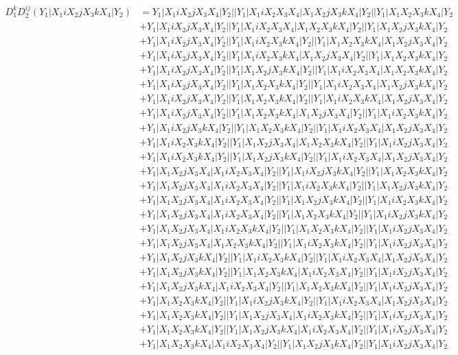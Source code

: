 \documentclass{article}[12pt]
\begin{document}
\begin{align*}
D_1^kD_2^{ij}(Y_1|X_1iX_2jX_3kX_4|Y_2)& =Y_1|X_1iX_2jX_3X_4|Y_2||Y_1|X_1iX_2X_3X_4|X_1X_2jX_3kX_4|Y_2||Y_1|X_1X_2X_3kX_4|Y_2\\ 
 & +Y_1|X_1iX_2jX_3X_4|Y_2||Y_1|X_1iX_2X_3X_4|X_1X_2X_3kX_4|Y_2||Y_1|X_1X_2jX_3kX_4|Y_2\\ 
 & +Y_1|X_1iX_2jX_3X_4|Y_2||Y_1|X_1iX_2X_3kX_4|Y_2||Y_1|X_1X_2X_3kX_4|X_1X_2jX_3X_4|Y_2\\ 
 & +Y_1|X_1iX_2jX_3X_4|Y_2||Y_1|X_1iX_2X_3kX_4|X_1X_2jX_3X_4|Y_2||Y_1|X_1X_2X_3kX_4|Y_2\\ 
 & +Y_1|X_1iX_2jX_3X_4|Y_2||Y_1|X_1X_2jX_3kX_4|Y_2||Y_1|X_1iX_2X_3X_4|X_1X_2X_3kX_4|Y_2\\ 
 & +Y_1|X_1iX_2jX_3X_4|Y_2||Y_1|X_1X_2X_3kX_4|Y_2||Y_1|X_1iX_2X_3X_4|X_1X_2jX_3kX_4|Y_2\\ 
 & +Y_1|X_1iX_2jX_3X_4|Y_2||Y_1|X_1X_2X_3kX_4|Y_2||Y_1|X_1iX_2X_3kX_4|X_1X_2jX_3X_4|Y_2\\ 
 & +Y_1|X_1iX_2jX_3X_4|Y_2||Y_1|X_1X_2X_3kX_4|X_1X_2jX_3X_4|Y_2||Y_1|X_1iX_2X_3kX_4|Y_2\\ 
 & +Y_1|X_1iX_2jX_3kX_4|Y_2||Y_1|X_1X_2X_3kX_4|Y_2||Y_1|X_1iX_2X_3X_4|X_1X_2jX_3X_4|Y_2\\ 
 & +Y_1|X_1iX_2X_3kX_4|Y_2||Y_1|X_1X_2jX_3X_4|X_1X_2X_3kX_4|Y_2||Y_1|X_1iX_2jX_3X_4|Y_2\\ 
 & +Y_1|X_1iX_2X_3kX_4|Y_2||Y_1|X_1X_2jX_3kX_4|Y_2||Y_1|X_1iX_2X_3X_4|X_1X_2jX_3X_4|Y_2\\ 
 & +Y_1|X_1X_2jX_3X_4|X_1iX_2X_3X_4|Y_2||Y_1|X_1iX_2jX_3kX_4|Y_2||Y_1|X_1X_2X_3kX_4|Y_2\\ 
 & +Y_1|X_1X_2jX_3X_4|X_1iX_2X_3X_4|Y_2||Y_1|X_1iX_2X_3kX_4|Y_2||Y_1|X_1X_2jX_3kX_4|Y_2\\ 
 & +Y_1|X_1X_2jX_3X_4|X_1iX_2X_3X_4|Y_2||Y_1|X_1X_2jX_3kX_4|Y_2||Y_1|X_1iX_2X_3kX_4|Y_2\\ 
 & +Y_1|X_1X_2jX_3X_4|X_1iX_2X_3X_4|Y_2||Y_1|X_1X_2X_3kX_4|Y_2||Y_1|X_1iX_2jX_3kX_4|Y_2\\ 
 & +Y_1|X_1X_2jX_3X_4|X_1iX_2X_3kX_4|Y_2||Y_1|X_1X_2X_3kX_4|Y_2||Y_1|X_1iX_2jX_3X_4|Y_2\\ 
 & +Y_1|X_1X_2jX_3X_4|X_1X_2X_3kX_4|Y_2||Y_1|X_1iX_2X_3kX_4|Y_2||Y_1|X_1iX_2jX_3X_4|Y_2\\ 
 & +Y_1|X_1X_2jX_3kX_4|Y_2||Y_1|X_1iX_2X_3kX_4|Y_2||Y_1|X_1iX_2X_3X_4|X_1X_2jX_3X_4|Y_2\\ 
 & +Y_1|X_1X_2jX_3kX_4|Y_2||Y_1|X_1X_2X_3kX_4|X_1iX_2X_3X_4|Y_2||Y_1|X_1iX_2jX_3X_4|Y_2\\ 
 & +Y_1|X_1X_2jX_3kX_4|X_1iX_2X_3X_4|Y_2||Y_1|X_1X_2X_3kX_4|Y_2||Y_1|X_1iX_2jX_3X_4|Y_2\\ 
 & +Y_1|X_1X_2X_3kX_4|Y_2||Y_1|X_1iX_2jX_3kX_4|Y_2||Y_1|X_1iX_2X_3X_4|X_1X_2jX_3X_4|Y_2\\ 
 & +Y_1|X_1X_2X_3kX_4|Y_2||Y_1|X_1X_2jX_3X_4|X_1iX_2X_3kX_4|Y_2||Y_1|X_1iX_2jX_3X_4|Y_2\\ 
 & +Y_1|X_1X_2X_3kX_4|Y_2||Y_1|X_1X_2jX_3kX_4|X_1iX_2X_3X_4|Y_2||Y_1|X_1iX_2jX_3X_4|Y_2\\ 
 & +Y_1|X_1X_2X_3kX_4|X_1iX_2X_3X_4|Y_2||Y_1|X_1X_2jX_3kX_4|Y_2||Y_1|X_1iX_2jX_3X_4|Y_2\end{align*}
\end{document}
